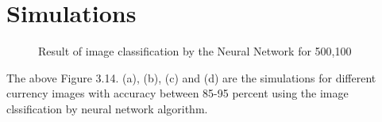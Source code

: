 \section{Simulations}
\begin{figure}[h!]
	\centering
	\caption{Result of image classification by the Neural Network for 500,100}
\end{figure}
\newpage
\noindent The above Figure 3.14. (a), (b), (c) and (d) are the simulations for different currency images with accuracy between 85-95 percent using the image clssification by neural network algorithm.\\
